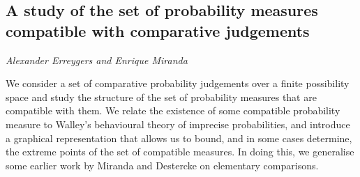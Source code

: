 \documentclass[../booklet.tex]{subfiles}
\begin{document}
\subsection[A study of the set of probability measures compatible with comparative judgements. {\it Alexander Erreygers and Enrique Miranda}]{A study of the set of probability measures compatible with comparative judgements}
 

\begin{center}
  {\it Alexander Erreygers and Enrique Miranda}
\end{center}



We consider a set of comparative probability judgements over a finite possibility space and study the structure of the set of probability measures that are compatible with them.
We relate the existence of some compatible probability measure to Walley's behavioural theory of imprecise probabilities, and introduce a graphical representation that allows us to bound, and in some cases determine, the extreme points of the set of compatible measures.
In doing this, we generalise some earlier work by Miranda and Destercke on elementary comparisons.

\end{document}
